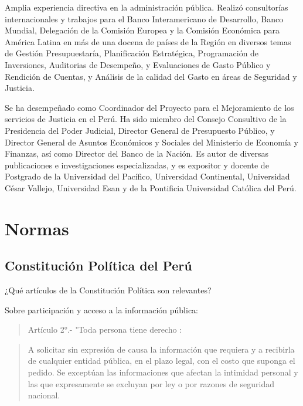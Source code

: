 \documentclass[
]{book}
\begin{document}
Amplia experiencia directiva en la administración pública. Realizó consultorías internacionales y trabajos para el Banco Interamericano de Desarrollo, Banco Mundial, Delegación de la Comisión Europea y la Comisión Económica para América Latina en más de una docena de países de la Región en diversos temas de Gestión Presupuestaría, Planificación Estratégica, Programación de Inversiones, Auditorias de Desempeño, y Evaluaciones de Gasto Público y Rendición de Cuentas, y Análisis de la calidad del Gasto en áreas de Seguridad y Justicia.

Se ha desempeñado como Coordinador del Proyecto para el Mejoramiento de los servicios de Justicia en el Perú. Ha sido miembro del Consejo Consultivo de la Presidencia del Poder Judicial, Director General de Presupuesto Público, y Director General de Asuntos Económicos y Sociales del Ministerio de Economía y Finanzas, así como Director del Banco de la Nación. Es autor de diversas publicaciones e investigaciones especializadas, y es expositor y docente de Postgrado de la Universidad del Pacífico, Universidad Continental, Universidad César Vallejo, Universidad Esan y de la Pontificia Universidad Católica del Perú.

\hypertarget{normas}{%
\chapter{Normas}\label{normas}}

\hypertarget{constituciuxf3n-poluxedtica-del-peruxfa}{%
\section{Constitución Política del Perú}\label{constituciuxf3n-poluxedtica-del-peruxfa}}

¿Qué artículos de la Constitución Política son relevantes?

Sobre participación y acceso a la información pública:

\begin{quote}
Artículo 2°.-
"Toda persona tiene derecho :
\end{quote}

\begin{quote}
A solicitar sin expresión de causa la información que requiera y a recibirla
de cualquier entidad pública, en el plazo legal, con el costo que suponga el
pedido. Se exceptúan las informaciones que afectan la intimidad personal
y las que expresamente se excluyan por ley o por razones de seguridad
nacional.
\end{quote}
\end{document}
